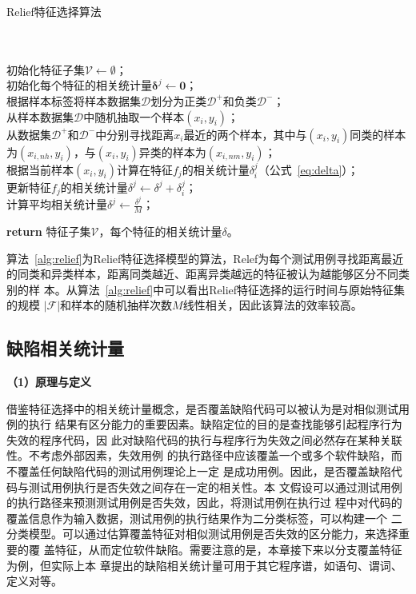\begin{algorithm}[H]
\caption{Relief特征选择算法}\label{alg:relief}
\\
 \\
初始化特征子集$\mathcal {V} \leftarrow \emptyset$；\\ 
初始化每个特征的相关统计量$\bm \delta^j \leftarrow \bm 0$；\\ 
根据样本标签将样本数据集$\mathcal D$划分为正类$\mathcal D^+$和负类$\mathcal D^-$；\\
 {
     从样本数据集$\mathcal D$中随机抽取一个样本$(x_i,y_i)$；\\
     从数据集$\mathcal D^+$和$\mathcal D^-$中分别寻找距离$x_i$最近的两个样本，其中与$(x_i,y_i)$同类的样本为$(x_{i,nh},y_i)$，与$(x_i,y_i)$异类的样本为$(x_{i,nm},y_i)$；\\
      {
            根据当前样本$(x_i,y_i)$计算在特征$f_j$的相关统计量$\delta^j_i$（公式~\eqref{eq:delta}）；\\
            更新特征$f_j$的相关统计量$\delta^j \leftarrow \delta^j + \delta^j_i$；\\
     }
}
 {
      计算平均相关统计量$\delta^j \leftarrow \frac{\delta^j}{M}$；\\
}

\textbf{return} 特征子集$\mathcal {V}$，每个特征的相关统计量$\delta$。\\
\end{algorithm}

算法~\ref{alg:relief}为Relief特征选择模型的算法，Relef为每个测试用例寻找距离最近
的同类和异类样本，距离同类越近、距离异类越远的特征被认为越能够区分不同类别的样
本。从算法~\ref{alg:relief}中可以看出Relief特征选择的运行时间与原始特征集的规模
$|\mathcal F|$和样本的随机抽样次数$M$线性相关，因此该算法的效率较高。

\subsection{缺陷相关统计量}
\textbf{（1）原理与定义}

借鉴特征选择中的相关统计量概念，是否覆盖缺陷代码可以被认为是对相似测试用例的执行
结果有区分能力的重要因素。缺陷定位的目的是查找能够引起程序行为失效的程序代码，因
此对缺陷代码的执行与程序行为失效之间必然存在某种关联性。不考虑外部因素，失效用例
的执行路径中应该覆盖一个或多个软件缺陷，而不覆盖任何缺陷代码的测试用例理论上一定
是成功用例。因此，是否覆盖缺陷代码与测试用例执行是否失效之间存在一定的相关性。本
文假设可以通过测试用例的执行路径来预测测试用例是否失效，因此，将测试用例在执行过
程中对代码的覆盖信息作为输入数据，测试用例的执行结果作为二分类标签，可以构建一个
二分类模型。可以通过估算覆盖特征对相似测试用例是否失效的区分能力，来选择重要的覆
盖特征，从而定位软件缺陷。需要注意的是，本章接下来以分支覆盖特征为例，但实际上本
章提出的缺陷相关统计量可用于其它程序谱，如语句、谓词、定义对等。

